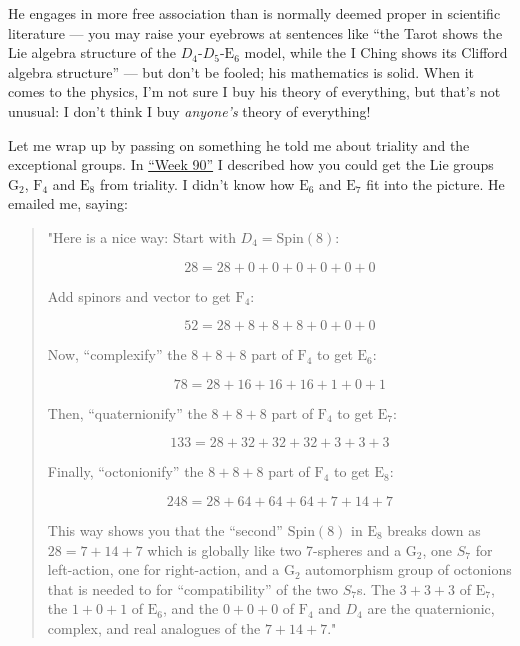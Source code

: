 \documentclass{article}
\def\tightlist{}
\renewcommand{\texttt}[1]{%
  \begingroup
  \ttfamily
  \begingroup\lccode`~=`/\lowercase{\endgroup\def~}{/\discretionary{}{}{}}%
  \begingroup\lccode`~=`[\lowercase{\endgroup\def~}{[\discretionary{}{}{}}%
  \begingroup\lccode`~=`.\lowercase{\endgroup\def~}{.\discretionary{}{}{}}%
  \catcode`/=\active\catcode`[=\active\catcode`.=\active
  \scantokens{#1\noexpand}%
  \endgroup
}
\begin{document}

He engages in more free association than is normally deemed proper in
scientific literature --- you may raise your eyebrows at sentences like
``the Tarot shows the Lie algebra structure of the
\(D_4\)-\(D_5\)-\(\mathrm{E}_6\) model, while the I Ching shows its
Clifford algebra structure'' --- but don't be fooled; his mathematics is
solid. When it comes to the physics, I'm not sure I buy his theory of
everything, but that's not unusual: I don't think I buy \emph{anyone's}
theory of everything!

Let me wrap up by passing on something he told me about triality and the
exceptional groups. In \protect\hyperlink{week90}{``Week 90''} I
described how you could get the Lie groups \(\mathrm{G}_2\),
\(\mathrm{F}_4\) and \(\mathrm{E}_8\) from triality. I didn't know how
\(\mathrm{E}_6\) and \(\mathrm{E}_7\) fit into the picture. He emailed
me, saying:

\begin{quote}
"Here is a nice way: Start with \(D_4 = \mathrm{Spin}(8)\):

\[28 =  28  +   0  +   0  +   0  +   0  +   0  +   0\]

Add spinors and vector to get \(\mathrm{F}_4\):

\[52 =  28  +   8  +   8  +   8  +   0  +   0  +   0\]

Now, ``complexify'' the \(8+8+8\) part of \(\mathrm{F}_4\) to get
\(\mathrm{E}_6\):

\[78 =  28  +  16  +  16  +  16  +   1  +   0  +   1\]

Then, ``quaternionify'' the \(8+8+8\) part of \(\mathrm{F}_4\) to get
\(\mathrm{E}_7\):

\[133 =  28  +  32  +  32  +  32  +   3  +   3  +   3\]

Finally, ``octonionify'' the \(8+8+8\) part of \(\mathrm{F}_4\) to get
\(\mathrm{E}_8\):

\[248 =  28  +  64  +  64  +  64  +   7  +  14  +   7\]

This way shows you that the ``second'' \(\mathrm{Spin}(8)\) in
\(\mathrm{E}_8\) breaks down as \(28 = 7 + 14 + 7\) which is globally
like two 7-spheres and a \(\mathrm{G}_2\), one \(S_7\) for left-action,
one for right-action, and a \(\mathrm{G}_2\) automorphism group of
octonions that is needed to for ``compatibility'' of the two \(S_7\)s.
The \(3+3+3\) of \(\mathrm{E}_7\), the \(1+0+1\) of \(\mathrm{E}_6\),
and the \(0+0+0\) of \(\mathrm{F}_4\) and \(D_4\) are the quaternionic,
complex, and real analogues of the \(7+14+7\)."
\end{quote}
\end{document}
